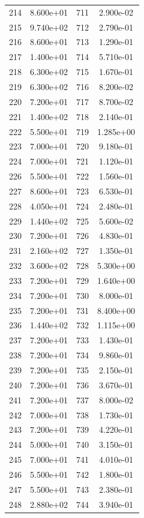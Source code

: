 \documentclass[12pt]{article}
\begin{document}
\begin{longtable}{@{}cccc@{}}
214 & 8.600e+01 & 711 & 2.900e-02 \\
215 & 9.740e+02 & 712 & 2.790e-01 \\
216 & 8.600e+01 & 713 & 1.290e-01 \\
217 & 1.400e+01 & 714 & 5.710e-01 \\
218 & 6.300e+02 & 715 & 1.670e-01 \\
219 & 6.300e+02 & 716 & 8.200e-02 \\
220 & 7.200e+01 & 717 & 8.700e-02 \\
221 & 1.400e+02 & 718 & 2.140e-01 \\
222 & 5.500e+01 & 719 & 1.285e+00 \\
223 & 7.000e+01 & 720 & 9.180e-01 \\
224 & 7.000e+01 & 721 & 1.120e-01 \\
226 & 5.500e+01 & 722 & 1.560e-01 \\
227 & 8.600e+01 & 723 & 6.530e-01 \\
228 & 4.050e+01 & 724 & 2.480e-01 \\
229 & 1.440e+02 & 725 & 5.600e-02 \\
230 & 7.200e+01 & 726 & 4.830e-01 \\
231 & 2.160e+02 & 727 & 1.350e-01 \\
232 & 3.600e+02 & 728 & 5.300e+00 \\
233 & 7.200e+01 & 729 & 1.640e+00 \\
234 & 7.200e+01 & 730 & 8.000e-01 \\
235 & 7.200e+01 & 731 & 8.400e+00 \\
236 & 1.440e+02 & 732 & 1.115e+00 \\
237 & 7.200e+01 & 733 & 1.430e-01 \\
238 & 7.200e+01 & 734 & 9.860e-01 \\
239 & 7.200e+01 & 735 & 2.150e-01 \\
240 & 7.200e+01 & 736 & 3.670e-01 \\
241 & 7.200e+01 & 737 & 8.000e-02 \\
242 & 7.000e+01 & 738 & 1.730e-01 \\
243 & 7.200e+01 & 739 & 4.220e-01 \\
244 & 5.000e+01 & 740 & 3.150e-01 \\
245 & 7.000e+01 & 741 & 4.010e-01 \\
246 & 5.500e+01 & 742 & 1.800e-01 \\
247 & 5.500e+01 & 743 & 2.380e-01 \\
248 & 2.880e+02 & 744 & 3.940e-01 \\

\end{longtable}
\end{document}
